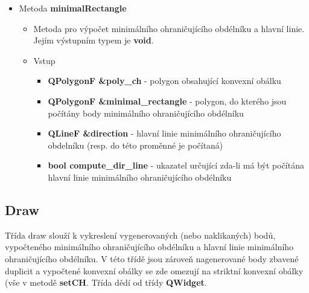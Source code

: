 \documentclass[a4paper, 12pt]{article}
\begin{document}
\begin{itemize}
	\item Metoda \textbf{minimalRectangle}
		\begin{itemize}
			\item Metoda pro výpočet minimálního ohraničujícího obdélníku a hlavní linie. Jejím výstupním typem je \textbf{void}.
			\item Vstup
				\begin{itemize}
					\item \textbf{QPolygonF \&poly\_ch} - polygon obsahující konvexní obálku
					\item \textbf{QPolygonF \&minimal\_rectangle} - polygon, do kterého jsou počítány body minimálního ohraničujícího obdélníku
					\item \textbf{QLineF \&direction} - hlavní linie minimálního ohraničujícího obdelníku (resp. do této proměnné je počítaná)
					\item \textbf{bool compute\_dir\_line} - ukazatel určující zda-li má být počítána hlavní linie minimálního ohraničujícího obdélníku
				\end{itemize}

		\end{itemize}
\end{itemize}

\subsection{Draw}
Třída draw slouží k vykreslení vygenerovaných (nebo naklikaných) bodů, vypočteného minimálního ohraničujícího obdélníku a hlavní linie minimálního ohraničujícího obdélníku. V této třídě jsou zároveň nagenerované body zbavené duplicit a vypočtené konvexní obálky se zde omezují na striktní konvexní obálky (vše v metodě \textbf{setCH}. Třída dědí od třídy \textbf{QWidget}. 
\end{document}
